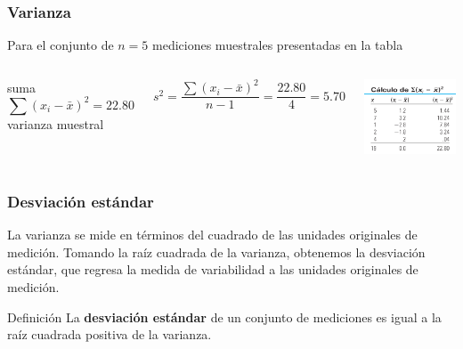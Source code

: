 \documentclass[spanish]{beamer}
\begin{document}
\begin{frame}
\frametitle{Varianza}
Para el conjunto de $n = 5$ mediciones muestrales presentadas en la tabla
\begin{columns}
suma
\begin{equation*}
\sum {(x_{i}- \bar{x})}^2=22.80
\end{equation*}
varianza muestral

\begin{equation*}
s^2= \frac{\sum {(x_{i}- \bar{x})}^2}{n-1}= \frac{22.80}{4}=5.70
\end{equation*}

\begin{center}
\includegraphics[width=\textwidth]{im14}
\end{center}
\end{columns}

\end{frame}
\begin{frame}
\frametitle{Desviación estándar}
La varianza se mide en términos del cuadrado de las unidades originales de medición. Tomando la raíz cuadrada de la varianza, obtenemos la desviación estándar, que regresa la medida de variabilidad a las unidades originales de medición.

\begin{block}{Definición}
La \textbf{desviación estándar} de un conjunto de mediciones es igual a la raíz
cuadrada positiva de la varianza.
\end{block}
\end{frame}
\end{document}
